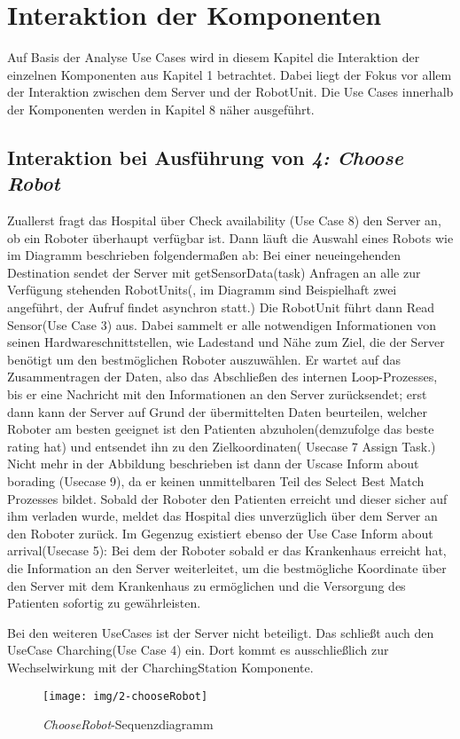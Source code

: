 \section{Interaktion der Komponenten}
Auf Basis der Analyse Use Cases wird in diesem Kapitel die Interaktion der einzelnen Komponenten aus Kapitel 1 betrachtet. Dabei liegt der Fokus vor allem der Interaktion zwischen dem Server und der RobotUnit. Die Use Cases innerhalb der Komponenten werden in Kapitel 8 näher ausgeführt. \\


\subsection*{Interaktion bei Ausführung von \emph{4: Choose Robot}}

Zuallerst fragt das Hospital über Check availability (Use Case 8) den Server an, ob ein Roboter überhaupt verfügbar ist. Dann läuft die Auswahl eines Robots wie im Diagramm beschrieben folgendermaßen ab: Bei einer neueingehenden Destination sendet der Server mit getSensorData(task) Anfragen an alle zur Verfügung stehenden RobotUnits(, im Diagramm sind Beispielhaft zwei angeführt, der Aufruf findet asynchron statt.) Die RobotUnit führt dann Read Sensor(Use Case 3) aus. Dabei sammelt er alle notwendigen Informationen von seinen Hardwareschnittstellen, wie Ladestand und Nähe zum Ziel, die der Server benötigt um den bestmöglichen Roboter auszuwählen. Er wartet auf das Zusammentragen der Daten, also das Abschließen des internen Loop-Prozesses, bis er eine Nachricht mit den Informationen an den Server zurücksendet; erst dann kann der Server auf Grund der übermittelten Daten beurteilen, welcher Roboter am besten geeignet ist den Patienten abzuholen(demzufolge das beste rating hat) und entsendet ihn zu den Zielkoordinaten( Usecase 7 Assign Task.) Nicht mehr in der Abbildung beschrieben ist dann der Uscase Inform about borading (Usecase 9), da er keinen unmittelbaren Teil des Select Best Match Prozesses bildet. Sobald der Roboter den Patienten erreicht und dieser sicher auf ihm verladen wurde, meldet das Hospital dies unverzüglich über dem Server an den Roboter zurück. Im Gegenzug existiert ebenso der Use Case Inform about arrival(Usecase 5): Bei dem der Roboter sobald er das Krankenhaus erreicht hat, die Information an den Server weiterleitet, um die bestmögliche Koordinate über den Server mit dem Krankenhaus zu ermöglichen und die Versorgung des Patienten sofortig zu gewährleisten.

Bei den weiteren UseCases ist der Server nicht beteiligt. Das schließt auch den UseCase Charching(Use Case 4) ein. Dort kommt es ausschließlich zur Wechselwirkung mit der CharchingStation Komponente.


\begin{figure}[H]
	\centering
	\texttt{[image: img/2-chooseRobot]}
	\caption{\emph{ChooseRobot}-Sequenzdiagramm}
	\label{SequenzDiagrammInteraktion}
\end{figure}
